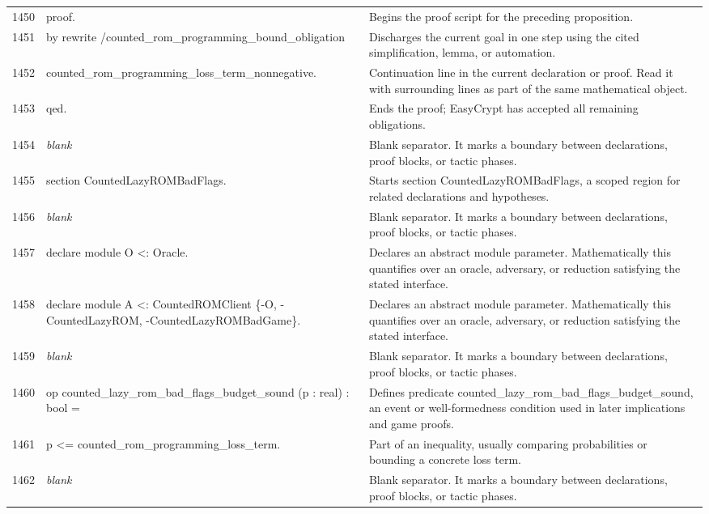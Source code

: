 \documentclass[10pt]{article}
\begin{document}
\begin{longtable}{r L{0.53\textwidth} L{0.37\textwidth}}
1450 & {\ttfamily\scriptsize proof.} & Begins the proof script for the preceding proposition. \\
1451 & {\ttfamily\scriptsize by rewrite /counted\_rom\_programming\_bound\_obligation} & Discharges the current goal in one step using the cited simplification, lemma, or automation. \\
1452 & {\ttfamily\scriptsize    counted\_rom\_programming\_loss\_term\_nonnegative.} & Continuation line in the current declaration or proof.  Read it with surrounding lines as part of the same mathematical object. \\
1453 & {\ttfamily\scriptsize qed.} & Ends the proof; EasyCrypt has accepted all remaining obligations. \\
1454 & {\ttfamily\scriptsize \emph{blank}} & Blank separator.  It marks a boundary between declarations, proof blocks, or tactic phases. \\
1455 & {\ttfamily\scriptsize section CountedLazyROMBadFlags.} & Starts section CountedLazyROMBadFlags, a scoped region for related declarations and hypotheses. \\
1456 & {\ttfamily\scriptsize \emph{blank}} & Blank separator.  It marks a boundary between declarations, proof blocks, or tactic phases. \\
1457 & {\ttfamily\scriptsize declare module O <: Oracle.} & Declares an abstract module parameter.  Mathematically this quantifies over an oracle, adversary, or reduction satisfying the stated interface. \\
1458 & {\ttfamily\scriptsize declare module A <: CountedROMClient \{-O, -CountedLazyROM, -CountedLazyROMBadGame\}.} & Declares an abstract module parameter.  Mathematically this quantifies over an oracle, adversary, or reduction satisfying the stated interface. \\
1459 & {\ttfamily\scriptsize \emph{blank}} & Blank separator.  It marks a boundary between declarations, proof blocks, or tactic phases. \\
1460 & {\ttfamily\scriptsize op counted\_lazy\_rom\_bad\_flags\_budget\_sound (p : real) : bool =} & Defines predicate counted\_lazy\_rom\_bad\_flags\_budget\_sound, an event or well-formedness condition used in later implications and game proofs. \\
1461 & {\ttfamily\scriptsize   p <= counted\_rom\_programming\_loss\_term.} & Part of an inequality, usually comparing probabilities or bounding a concrete loss term. \\
1462 & {\ttfamily\scriptsize \emph{blank}} & Blank separator.  It marks a boundary between declarations, proof blocks, or tactic phases. \\

\end{longtable}
\end{document}
